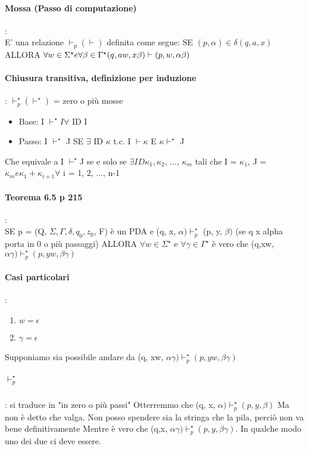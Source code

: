\documentclass[12pt, a4paper, openany, oneside]{book}
\begin{document}
\paragraph{Mossa (Passo di computazione)}:\\
E' una relazione $\vdash_{p} (\vdash)$ definita come segue: SE $(p, \alpha) \in 
\delta (q, a, x)$ ALLORA $\forall w \in \Sigma^{\star} e \forall \beta \in \Gamma^{\star}\\
(q, aw, x\beta) \vdash (p, w, \alpha \beta)$
\paragraph{Chiusura transitiva, definizione per induzione}: 
$\vdash^{\star}_{p}  (\vdash^{\star})$ = zero o più mosse
\begin{itemize}
	\item Base: I $\vdash^{\star} I \forall$ ID I
	\item Passo: I $\vdash^{\star}$ J SE $\exists$ ID $\kappa$ t.c. I $\vdash \kappa$  E
	$\kappa \vdash^{\star}$ J
\end{itemize}
Che equivale a I $\vdash^{\star}$J se e solo se $\exists ID \kappa_{1}, \kappa_{2}$,
..., $\kappa_{m}$ tali che I = $\kappa_{1}$, J = $\kappa_{m} e \kappa_{1} + \kappa_{i+1} 
\forall$ i = 1, 2, ..., n-1
\paragraph{Teorema 6.5 p 215}:\\
SE p = (Q, $\Sigma, \Gamma, \delta, q_{0}, z_{0}$, F) è un PDA e (q, x, $\alpha) \vdash^{\star}_{p}$
(p, y,  $\beta)$ (se q x alpha porta in 0 o più passaggi) ALLORA $\forall w \in \Sigma^{\star}$
e $\forall \gamma \in \Gamma^{\star}$ è vero che (q,xw, $\alpha\gamma) \vdash^{\star}_{p}
(p, yw, \beta\gamma)$
\paragraph{Casi particolari}:\\
\begin{enumerate}
	\item $w = \epsilon$
	\item $\gamma = \epsilon$
\end{enumerate}
Supponiamo sia possibile andare da (q, xw, $\alpha\gamma) \vdash^{\star}_{p} (p, yw, \beta\gamma)$
\subparagraph{$\vdash^{\star}_{p}$}: si traduce in "in zero o più passi"
Otterremmo che (q, x, $\alpha) \vdash^{\star}_{p} (p, y, \beta)$ Ma non è detto 
che valga. Non posso spendere sia la stringa che la pila, perciò non va bene 
definitivamente Mentre è vero che (q,x, $\alpha\gamma) \vdash^{\star}_{p}
(p, y, \beta\gamma)$. In qualche modo uno dei due ci deve essere. 
\end{document}
